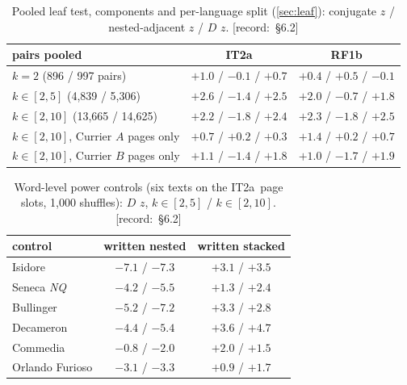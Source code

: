 \documentclass[11pt,a4paper]{article}
\newcommand{\src}[1]{{\footnotesize\color{muted}\sffamily\mbox{[record: \S#1]}}}
\newcommand{\Dstat}{D}
\newcommand{\IT}{\textcolor{it2a}{IT2a}}
\newcommand{\RF}{\textcolor{rf1b}{RF1b}}
\begin{document}
\begin{table}[H]
\centering\small
\caption{Pooled leaf test, components and per-language split (\cref{sec:leaf}): conjugate $z$ / nested-adjacent $z$ / $\Dstat$ $z$. \src{6.2}}
\begin{tabular}{@{}lcc@{}}
\toprule
pairs pooled & \IT & \RF\\
\midrule
$k=2$ (896 / 997 pairs) & $+1.0$ / $-0.1$ / $\mathbf{+0.7}$ & $+0.4$ / $+0.5$ / $\mathbf{-0.1}$\\
$k\in[2,5]$ (4,839 / 5,306) & $+2.6$ / $-1.4$ / $\mathbf{+2.5}$ & $+2.0$ / $-0.7$ / $\mathbf{+1.8}$\\
$k\in[2,10]$ (13,665 / 14,625) & $+2.2$ / $-1.8$ / $\mathbf{+2.4}$ & $+2.3$ / $-1.8$ / $\mathbf{+2.5}$\\
$k\in[2,10]$, Currier $A$ pages only & $+0.7$ / $+0.2$ / $+0.3$ & $+1.4$ / $+0.2$ / $+0.7$\\
$k\in[2,10]$, Currier $B$ pages only & $+1.1$ / $-1.4$ / $+1.8$ & $+1.0$ / $-1.7$ / $+1.9$\\
\bottomrule
\end{tabular}
\end{table}

\begin{table}[H]
\centering\small
\caption{Word-level power controls (six texts on the \IT\ page slots, 1,000 shuffles): $\Dstat$ $z$, $k\in[2,5]$ / $k\in[2,10]$. \src{6.2}}
\begin{tabular}{@{}lcc@{}}
\toprule
control & written nested & written stacked\\
\midrule
Isidore & $-7.1$ / $-7.3$ & $+3.1$ / $+3.5$\\
Seneca \emph{NQ} & $-4.2$ / $-5.5$ & $+1.3$ / $+2.4$\\
Bullinger & $-5.2$ / $-7.2$ & $+3.3$ / $+2.8$\\
Decameron & $-4.4$ / $-5.4$ & $+3.6$ / $+4.7$\\
Commedia & $-0.8$ / $-2.0$ & $+2.0$ / $+1.5$\\
Orlando Furioso & $-3.1$ / $-3.3$ & $+0.9$ / $+1.7$\\
\bottomrule
\end{tabular}
\end{table}
\end{document}
